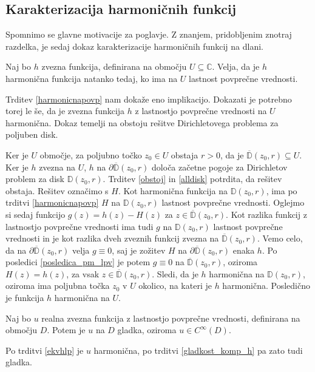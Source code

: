 \documentclass[mat1, tisk]{fmfdelo}
\begin{document}
\subsection{Karakterizacija harmoničnih funkcij}
    Spomnimo se glavne motivacije za poglavje.
    Z znanjem, pridobljenim znotraj razdelka, je sedaj dokaz karakterizacije harmoničnih funkcij na dlani.
    
    \begin{trditev}
        \label{ekvhlp}
        Naj bo $h$ zvezna funkcija, definirana na območju $U \subseteq \mathbb{C}$. Velja, da je $h$ harmonična funkcija natanko tedaj, ko ima na $U$ lastnost povprečne vrednosti.
    \end{trditev}
    \begin{dokaz}
        Trditev \ref{harmonicnapovp} nam dokaže eno implikacijo. Dokazati je potrebno torej le še, da je zvezna funkcija $h$ z lastnostjo povprečne vrednosti na $U$ harmonična. 
        Dokaz temelji na obstoju rešitve Dirichletovega problema za poljuben disk. 
        
        Ker je $U$ območje, za poljubno točko $z_0 \in U$ obstaja $r>0$, da je $\overline{\mathbb{D}}(z_0,r) \subseteq U$. Ker je $h$ zvezna na $U$, $h$ na $\partial \overline{\mathbb{D}}(z_0, r)$ določa začetne pogoje za Dirichletov problem za disk $\mathbb{D}(z_0,r)$.
        Trditev \ref{obstoj} in \ref{alldisk} potrdita, da rešitev obstaja. Rešitev označimo s $H$.
        Kot harmonična funkcija na $\mathbb{D}(z_0, r)$, ima po trditvi \ref{harmonicnapovp} $H$ na $\mathbb{D}(z_0, r)$ lastnost povprečne vrednosti. 
        Oglejmo si sedaj funkcijo $g(z) = h(z) - H(z)$ za $z \in \overline{\mathbb{D}}(z_0,r)$. 
        Kot razlika funkcij z lastnostjo povprečne vrednosti ima tudi $g$ na $\mathbb{D}(z_0, r)$ lastnost povprečne vrednosti in je kot razlika dveh zveznih funkcij zvezna na $\overline{\mathbb{D}}(z_0, r)$.
        Vemo celo, da na $\partial \overline{\mathbb{D}}(z_0, r)$ velja $g \equiv 0$, saj je zožitev $H$ na $\partial \overline{\mathbb{D}}(z_0,r)$ enaka $h$. 
        Po posledici \ref{posledica_pm_lpv} je potem $g \equiv 0$ na $\overline{\mathbb{D}}(z_0, r)$, oziroma $H(z) =  h(z)$, za vsak $z \in \overline{\mathbb{D}}(z_0, r)$. Sledi, da je $h$ harmonična na $\mathbb{D}(z_0, r)$, oziroma ima poljubna točka $z_0$ v $U$ okolico, na kateri je $h$ harmonična. 
        Posledično je funkcija $h$ harmonična na $U$.
    \end{dokaz}
    \begin{posledica}
        Naj bo $u$ realna zvezna funkcija z lastnostjo povprečne vrednosti, definirana na območju $D$. Potem je $u$ na $D$ gladka, oziroma $u \in C^{\infty}(D)$.
    \end{posledica}
    \begin{dokaz}
        Po trditvi \ref{ekvhlp} je $u$ harmonična, po trditvi \ref{gladkost_komp_h} pa zato tudi gladka.
    \end{dokaz}
\end{document}
